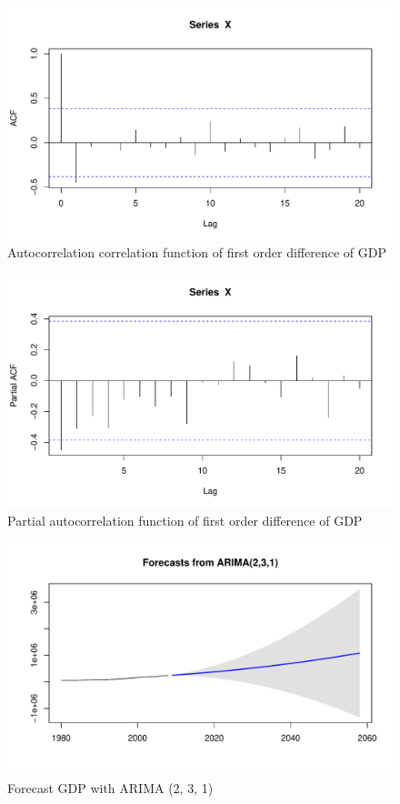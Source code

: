 \begin{enumerate}
    \begin{figure}[H] 
    \centering 
    \includegraphics[width=0.5\linewidth]{fig/gdp_diff3_acf.pdf}
    \caption{Autocorrelation correlation function of first order difference of GDP}
    \label{fig: gdpacf}
    \end{figure}
    
    \begin{figure}[H] 
    \centering 
    \includegraphics[width=0.5\linewidth]{fig/gdp_diff3_pacf.pdf}
    \caption{Partial autocorrelation function of first order difference of GDP}
    \label{fig: gdppacf}
    \end{figure}
    
            \begin{figure}[H] 
    \centering 
    \includegraphics[width=0.5\linewidth]{fig/gdp_forecast.pdf}
    \caption{Forecast GDP with ARIMA (2, 3, 1)}
    \label{fig: gdpforecast}
    \end{figure}
    

\end{enumerate}

